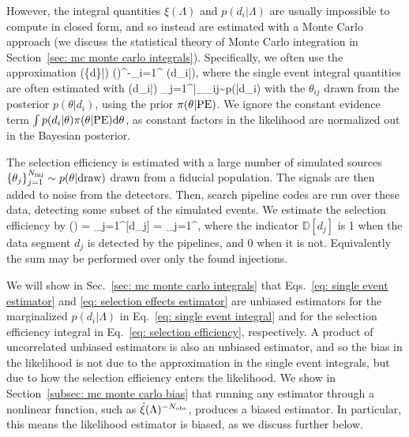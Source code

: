 \documentclass[%
 reprint,
 amsmath,amssymb,
 aps,nofootinbib,nobibnotes,onecolumn,prd
]{revtex4-2}
\begin{document}
However, the integral quantities $\xi(\Lambda)$ and $p(d_i|\Lambda)$ are usually impossible to compute in closed form, and so instead are estimated with a Monte Carlo approach (we discuss the statistical theory of Monte Carlo integration in Section~\ref{sec: mc monte carlo integrals}). Specifically, we often use the approximation
\beq
{}(\{d\}|\Lambda) \propto \hat{\xi}(\Lambda)^{-\Nobs}\prod_{i=1}^{\Nobs} (d_i|\Lambda),
\label{eq: estimated hierarchical likelihood}
\eeq
where the single event integral quantities are often estimated with 
\beq
{}(d_i|\Lambda) \propto {}\sum_{j=1}^{\NPE}\bigg|_{\theta_{ij}\sim p(\theta|d_i)}
\label{eq: single event estimator}
\eeq
with the $\theta_{ij}$ drawn from the \PE posterior $p(\theta|d_i)$, using the prior $\pi(\theta|{\rm PE})$. We ignore the constant evidence term $\int p(d_i|\theta)\pi(\theta|{\rm PE})\dd\theta$, as constant factors in the likelihood are normalized out in the Bayesian posterior. 

The selection efficiency is estimated with a large number of simulated sources $\{\theta_j\}_{j=1}^{N_{\rm inj}} \sim p(\theta|{\rm draw})$ drawn from a fiducial population. The signals are then added to noise from the \GW detectors. Then, search pipeline codes \citep[e.g.][]{Allen:2005fk, Usman:2015kfa, Messick:2016aqy} are run over these data, detecting some subset of the simulated events. We estimate the selection efficiency by \citep{Tiwari:2017ndi, Farr:2019rap}
\beq
\hat{\xi}(\Lambda) = \sum_{j=1}^{\Ninj}[d_j] = \sum_{j=1}^{\Nfound},
\label{eq: selection effects estimator}
\eeq
where the indicator $\mathbb{D}[d_j]$ is 1 when the data segment $d_j$ is detected by the pipelines, and 0 when it is not. Equivalently the sum may be performed over only the found injections. 

We will show in Sec.~\ref{sec: mc monte carlo integrals} that Eqs.~\ref{eq: single event estimator} and \ref{eq: selection effects estimator} are unbiased estimators for the marginalized $p(d_i|\Lambda)$ in Eq.~\ref{eq: single event integral} and for the selection efficiency integral in Eq.~\ref{eq: selection efficiency}, respectively. A product of uncorrelated unbiased estimators is also an unbiased estimator, and so the bias in the likelihood is not due to the approximation in the single event integrals, but due to how the selection efficiency enters the likelihood.
We show in Section~\ref{subsec: mc monte carlo bias} that running any estimator through a nonlinear function, such as $\hat{\xi}(\Lambda)^{-N_{\rm obs}}$, produces a biased estimator. In particular, this means the likelihood estimator is biased, as we discuss further below. 
\end{document}
